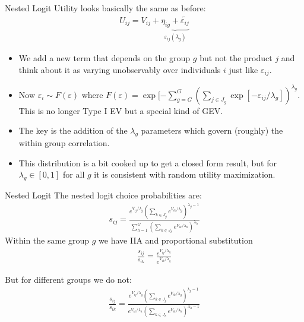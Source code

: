 \documentclass[xcolor=pdftex,dvipsnames,table,mathserif,aspectratio=169]{beamer}
\begin{document}
\begin{frame}{Nested Logit}
Utility looks basically the same as before:
\begin{eqnarray*}
U_{ij} = V_{ij} + \underbrace{\eta_{ig} + \widetilde{\varepsilon_{ij}}}_{\varepsilon_{ij}(\lambda_g)}
\end{eqnarray*}
\begin{itemize}
\item We add a new term that depends on the group $g$ but not the product $j$ and think about it as varying unobservably over individuals $i$ just like $\varepsilon_{ij}$.
\item Now $\varepsilon_i \sim F(\varepsilon)$ where $F(\varepsilon) = \exp[-\sum_{g=G}^G \left(\sum_{j \in J_g} \exp[-\varepsilon_{ij}/\lambda_g]\right)^{\lambda_g}$. This is no longer Type I EV but a special kind of GEV.
\item The key is the addition of the $\lambda_g$ parameters which govern (roughly) the within group correlation.
\item This distribution is a bit cooked up to get a closed form result, but for $\lambda_g \in [0,1]$ for all $g$ it is consistent with random utility maximization.
\end{itemize}
\end{frame}

\begin{frame}{Nested Logit}
\small
The nested logit choice probabilities are:
\begin{eqnarray*}
s_{ij} = \frac{ e^{V_{ij}/\lambda_g} \left(\sum_{k \in J_g} e^{V_{ik}/\lambda_g} \right)^{\lambda_g -1}}{\sum_{h=1}^G \left(\sum_{k \in J_h} e^{V_{ik}/\lambda_h} \right)^{\lambda_h}}
\end{eqnarray*}
Within the same group $g$ we have IIA and proportional substitution
\begin{eqnarray*}
\frac{s_{ij}}{s_{ik}} = \frac{ e^{V_{ij}/\lambda_g}}{ e^{V_{ik}/\lambda_g}}
\end{eqnarray*}

But for different groups we do not:
\begin{eqnarray*}
\frac{s_{ij}}{s_{ik}} = \frac{ e^{V_{ij}/\lambda_g} \left(\sum_{k \in J_g} e^{V_{ik}/\lambda_g} \right)^{\lambda_g -1}}{ e^{V_{ik}/\lambda_h} \left(\sum_{k \in J_h} e^{V_{ik}/\lambda_h} \right)^{\lambda_h -1}}
\end{eqnarray*}
\end{frame}
\end{document}
